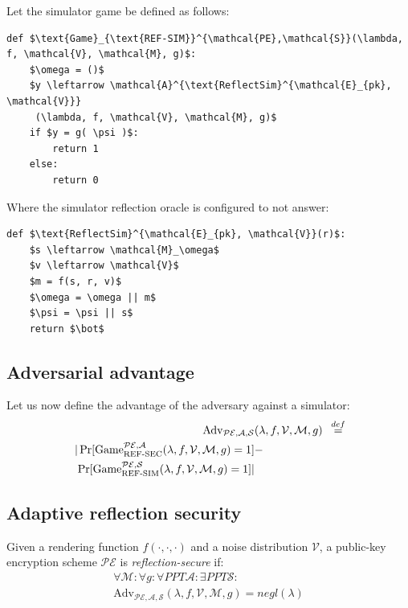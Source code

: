 \documentclass[conference, letterpaper, 10pt]{IEEEtran}
\newcommand\defeq{\stackrel{\mathclap{\normalfont\mbox{def}}}{=}}
\begin{document}
Let the simulator game be defined as follows:

\begin{lstlisting}[texcl,mathescape,basicstyle=\small]
def $\text{Game}_{\text{REF-SIM}}^{\mathcal{PE},\mathcal{S}}(\lambda, f, \mathcal{V}, \mathcal{M}, g)$:
    $\omega = ()$
    $y \leftarrow \mathcal{A}^{\text{ReflectSim}^{\mathcal{E}_{pk}, \mathcal{V}}}
     (\lambda, f, \mathcal{V}, \mathcal{M}, g)$
    if $y = g( \psi )$:
        return 1
    else:
        return 0
\end{lstlisting}

Where the simulator reflection oracle is configured to not answer:

\begin{lstlisting}[texcl,mathescape,basicstyle=\small]
def $\text{ReflectSim}^{\mathcal{E}_{pk}, \mathcal{V}}(r)$:
    $s \leftarrow \mathcal{M}_\omega$
    $v \leftarrow \mathcal{V}$
    $m = f(s, r, v)$
    $\omega = \omega || m$
    $\psi = \psi || s$
    return $\bot$
\end{lstlisting}

\subsection{Adversarial advantage}\label{subsec:refsecadv}

Let us now define the advantage of the adversary against a simulator:
\begin{align*}
    \text{Adv}_{\mathcal{PE}, \mathcal{A}, \mathcal{S}}&(\lambda, f, \mathcal{V}, \mathcal{M}, g) &\defeq\\
    |\Pr[\text{Game}_{\text{REF-SEC}}^{\mathcal{PE},\mathcal{A}}(\lambda, f, \mathcal{V}, \mathcal{M}, g) = 1] &-\\
    \Pr[\text{Game}_{\text{REF-SIM}}^{\mathcal{PE},\mathcal{S}}(\lambda, f, \mathcal{V}, \mathcal{M}, g) = 1]| &
\end{align*}

\subsection{Adaptive reflection security}\label{subsec:adaptiverefsec}

Given a rendering function $f(\cdot, \cdot, \cdot)$ and
a noise distribution $\mathcal{V}$, a public-key encryption scheme
$\mathcal{PE}$ is \textit{reflection-secure} if:
\begin{align*}
\forall \mathcal{M}:
\forall g:
\forall PPT \mathcal{A}:
\exists PPT \mathcal{S}:\\
\text{Adv}_{\mathcal{PE}, \mathcal{A}, \mathcal{S}}(\lambda, f, \mathcal{V}, \mathcal{M}, g) = negl(\lambda)
\end{align*}
\end{document}
